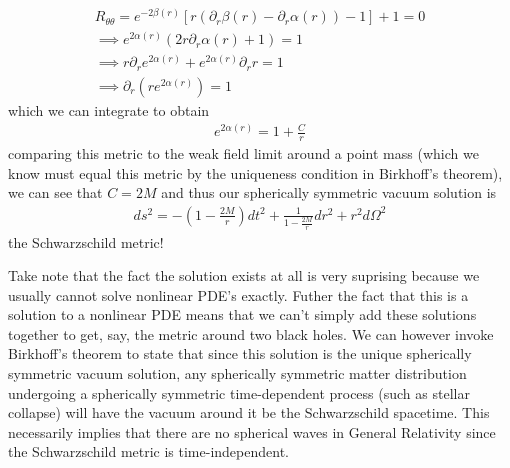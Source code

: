 \documentclass[11pt,table]{article}
\begin{document}
            \begin{align*}
                R_{\theta\theta}=e^{-2\beta(r)}[r(\partial_r\beta(r)-\partial_r\alpha(r))-1]+1 = 0\\
                \implies e^{2\alpha(r)}(2r\partial_r\alpha(r) +1)=1\\
                \implies r\partial_re^{2\alpha(r)}+e^{2\alpha(r)}\partial_rr=1\\
                \implies\partial_r(re^{2\alpha(r)}) = 1
            \end{align*}
            which we can integrate to obtain
            \begin{align}
                e^{2\alpha(r)}=1+\frac{C}{r}
            \end{align}
            comparing this metric to the weak field limit around a point mass (which we know must equal this metric by the uniqueness condition in Birkhoff's theorem), we can see that $C=2M$ and thus our spherically symmetric vacuum solution is 
            \begin{align}
                ds^2 = -\left(1-\frac{2M}{r}\right)dt^2+\frac{1}{1-\frac{2M}{r}}dr^2 + r^2d\Omega^2
            \end{align}
            the Schwarzschild metric!
            
            Take note that the fact the solution exists at all is very suprising because we usually cannot solve nonlinear PDE's exactly.  Futher the fact that this is a solution to a nonlinear PDE means that we can't simply add these solutions together to get, say, the metric around two black holes.  We can however invoke Birkhoff's theorem to state that since this solution is the unique spherically symmetric vacuum solution, any spherically symmetric matter distribution undergoing a spherically symmetric time-dependent process (such as stellar collapse) will have the vacuum around it be the Schwarzschild spacetime.  This necessarily implies that there are no spherical waves in General Relativity since the Schwarzschild metric is time-independent.
\end{document}
